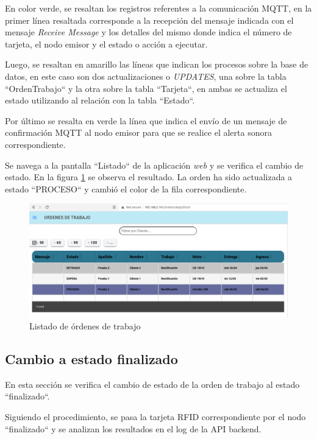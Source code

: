 En color verde, se resaltan los registros referentes a la comunicación MQTT, en la primer línea resaltada corresponde a la recepción del mensaje indicada con el mensaje \textit{Receive Message} y los detalles del mismo donde indica el número de tarjeta, el nodo emisor y el estado o acción a ejecutar.

Luego, se resaltan en amarillo las líneas que indican los procesos sobre la base de datos, en este caso son dos actualizaciones o \textit{UPDATES}, una sobre la tabla ``OrdenTrabajo`` y la otra sobre la tabla ``Tarjeta``, en ambas se actualiza el estado utilizando al relación con la tabla ``Estado``.

Por último se resalta en verde la línea que indica el envío de un mensaje de confirmación MQTT al nodo emisor para que se realice el alerta sonora correspondiente.

Se navega a la pantalla ``Listado`` de la aplicación \textit{web} y se verifica el cambio de estado. En la figura \ref{fig:ensayolistadoweb} se observa el resultado. La orden ha sido actualizada a estado ``PROCESO`` y cambió el color de la fila correspondiente.

\begin{figure}[H]
	\centering
	\includegraphics[width=\textwidth]{./Figures/ensayo-1/12.cambioestado-listado.png}
	\caption{Listado de órdenes de trabajo}
	\label{fig:ensayolistadoweb}
\end{figure}

\subsection{Cambio a estado finalizado}
\label{subsec:ensayoafinalizado}

En esta sección se verifica el cambio de estado de la orden de trabajo al estado ``finalizado``.

Siguiendo el procedimiento, se pasa la tarjeta RFID correspondiente por el nodo ``finalizado`` y se analizan los resultados en el log de la API backend.

